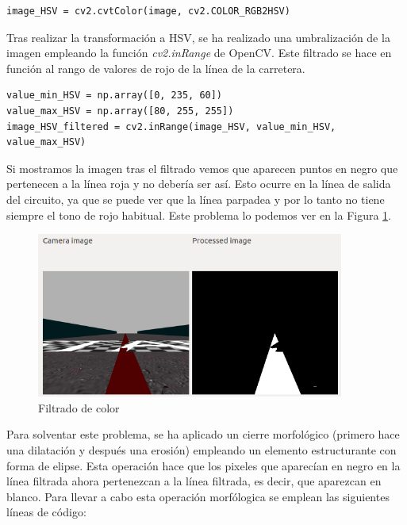 \vspace{10pt}
\begin{lstlisting}
image_HSV = cv2.cvtColor(image, cv2.COLOR_RGB2HSV)
\end{lstlisting}
\vspace{20pt}


Tras realizar la transformación a HSV, se ha realizado una umbralización de la imagen empleando la función \textit{cv2.inRange} de OpenCV. Este filtrado se hace en función al rango de valores de rojo de la línea de la carretera.\\

\vspace{10pt}
\begin{lstlisting}
value_min_HSV = np.array([0, 235, 60])
value_max_HSV = np.array([80, 255, 255])
image_HSV_filtered = cv2.inRange(image_HSV, value_min_HSV, value_max_HSV)
\end{lstlisting}
\vspace{20pt}


Si mostramos la imagen tras el filtrado vemos que aparecen puntos en negro que pertenecen a la línea roja y no debería ser así. Esto ocurre en la línea de salida del circuito, ya que se puede ver que la línea parpadea y por lo tanto no tiene siempre el tono de rojo habitual. Este problema lo podemos ver en la Figura \ref{fig.color}.\\

\begin{figure}
  \begin{center}
    \includegraphics[width=0.9\textwidth]{figures/Infraestructura/filtro_color.png}
		\caption{Filtrado de color}
		\label{fig.color}
		\end{center}
\end{figure}

Para solventar este problema, se ha aplicado un cierre morfológico (primero hace una dilatación y después una erosión) empleando un elemento estructurante con forma de elipse. Esta operación hace que los pixeles que aparecían en negro en la línea filtrada ahora pertenezcan a la línea filtrada, es decir, que aparezcan en blanco. Para llevar a cabo esta operación morfólogica se emplean las siguientes líneas de código:\\

